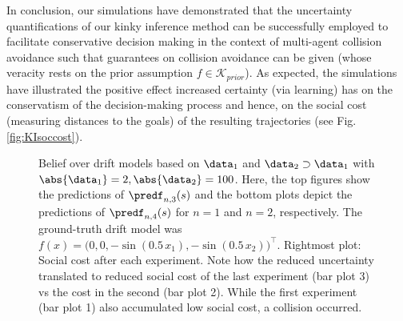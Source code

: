 In conclusion, our simulations have demonstrated that the uncertainty quantifications of our kinky inference method can be successfully employed to facilitate conservative decision making in the context of multi-agent collision avoidance such that guarantees on collision avoidance can be given (whose veracity rests on the prior assumption $f \in \mathcal K_{prior}$). As expected, the simulations have illustrated the positive effect increased certainty (via learning) has on the conservatism of the decision-making process and hence, on the social cost (measuring distances to the goals) of the resulting trajectories (see Fig. \ref{fig:KIsoccost}).  
\begin{figure} 
        \centering
   \caption{Belief over drift models based on $\data_1$ and $\data_2 \supset \data_1$ with $\abs{\data_1} = 2, \abs{\data_2} = 100$. Here, the top figures show the predictions of $\predf_{n,3}(s)$ and the bottom plots depict the predictions of $\predf_{n,4}(s)$ for $n =1$ and $n=2$, respectively. The ground-truth drift model was $f(x) = \bigl(0,0, - \sin(0.5 \, x_1), - \sin( 0.5 \, x_2) \bigr)^\top$. Rightmost plot: Social cost after each experiment. Note how the reduced uncertainty translated to reduced social cost of the last experiment (bar plot 3) vs the cost in the second (bar plot 2). While the first experiment (bar plot 1) also accumulated low social cost, a collision occurred.}
	\label{fig:KIcollavoidopenlooppredmodels}
\end{figure}	 